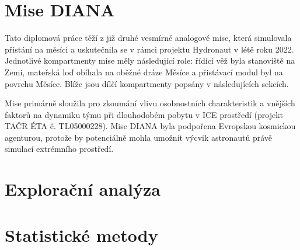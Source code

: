 \section{Mise DIANA}
\label{sec:mise_diana}
Tato diplomová práce těží z již druhé vesmírné analogové mise, která simulovala
přistání na měsíci a uskutečnila se v rámci projektu Hydronaut v létě roku 2022.
Jednotlivé kompartmenty mise měly následující role: řídící věž byla stanoviště
na Zemi, mateřská loď obíhala na oběžné dráze Měsíce a přistávací modul byl na
povrchu Měsíce. Blíže jsou dílčí kompartmenty popsány v následujících sekcích.

Mise primárně sloužila pro zkoumání vlivu osobnostních charakteristik a vnějších
faktorů na dynamiku týmu při dlouhodobém pobytu v \gls{ICE} prostředí (projekt
TAČR ÉTA č. TL05000228). Mise DIANA byla podpořena Evropskou kosmickou
agenturou, protože by potenciálně mohla umožnit výcvik astronautů právě simulací
extrémního prostředí. 


\section{Explorační analýza}
\label{sec:exploracni_analyza}

\section{Statistické metody}
\label{sec:statisticke_metody}


% 

% 

% 

